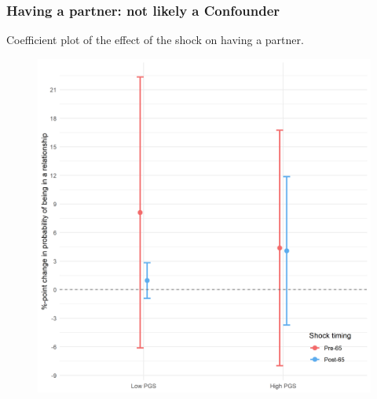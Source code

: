 \documentclass[10pt,compress,xcolor=dvipsnames,aspectratio=169]{beamer}    %
\newcounter{ex}
\newcommand{\1}[1]{\mathrm{1\hspace*{-2.5pt}l}[#1]}	%
\begin{document}
\begin{frame}
\frametitle{Having a partner: not likely a Confounder}
Coefficient plot of the effect of the shock on having a partner.
\begin{figure}[hbtp]
\centering
\includegraphics[height=0.8\textheight]{../../3_output/shock_effects/mpart_6070_100_cvplot.png}
\label{fig:mpart}
\end{figure}
\end{frame}
\end{document}
